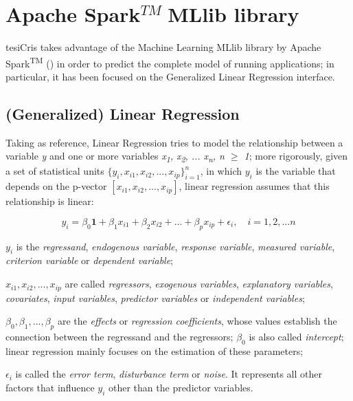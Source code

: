 \section{Apache Spark\texorpdfstring{$^{TM}\;$}MMLlib library}

tesiCris takes advantage of the Machine Learning MLlib library by Apache Spark\textsuperscript{TM} (\cite{spark2015apache}) in order to predict the complete model of running applications; in particular, it has been focused on the Generalized Linear Regression interface.


\subsection{(Generalized) Linear Regression}

Taking \cite{site:caltechML2012} as reference, Linear Regression tries to model the relationship between a variable \textit{y} and one or more variables \textit{x\textsubscript{1}, x\textsubscript{2}, ... x\textsubscript{n}, n $\ge$ 1}; more rigorously, given a set of statistical units $\{y_i, x_{i1}, x_{i2}, ..., x_{ip}\}_{i = 1}^n$, in which $y_i$ is the variable that depends on the p-vector $[x_{i1}, x_{i2}, ..., x_{ip}]$, linear regression assumes that this relationship is linear:

\begin{equation}
    y_i = \beta_0\boldsymbol{1} + \beta_1x_{i1} + \beta_2x_{i2} + ... +  \beta_px_{ip} + \epsilon_i, \quad i = 1, 2, ... n
\end{equation}

$y_i$ is the \textit{regressand}, \textit{endogenous variable}, \textit{response variable}, \textit{measured variable}, \textit{criterion variable} or \textit{dependent variable};

$x_{i1}, x_{i2}, ..., x_{ip}$ are called \textit{regressors}, \textit{exogenous variables}, \textit{explanatory variables}, \textit{covariates}, \textit{input variables}, \textit{predictor variables} or \textit{independent variables};

$\beta_0, \beta_1, ..., \beta_p$ are the \textit{effects} or \textit{regression coefficients}, whose values establish the connection between the regressand and the regressors; $\beta_0$ is also called \textit{intercept}; linear regression mainly focuses on the estimation of these parameters;

$\epsilon_i$ is called the \textit{error term}, \textit{disturbance term} or \textit{noise}. It represents all other factors that influence $y_i$ other than the predictor variables.

